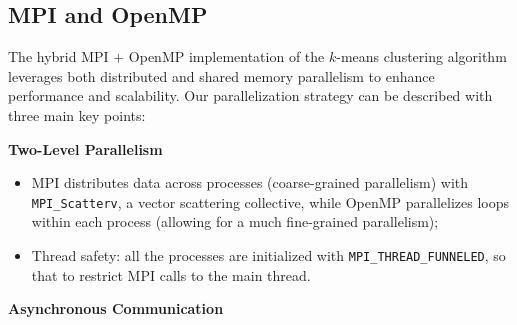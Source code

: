 \documentclass[11pt, journal]{IEEEtran}
\newcommand{\nwl}{

\vspace{11pt}

}
\begin{document}
\subsection{MPI and OpenMP}

The hybrid MPI $+$ OpenMP implementation of the $k$-means clustering algorithm leverages both distributed and shared memory parallelism to enhance performance and scalability. Our parallelization strategy can be described with three main key points:
\nwl
\noindent \textbf{Two-Level Parallelism}
\begin{itemize}
    \item MPI distributes data across processes (coarse-grained parallelism) with \texttt{MPI\_Scatterv}, a vector scattering collective, while OpenMP parallelizes loops within each process (allowing for a much fine-grained parallelism);
    \item Thread safety: all the processes are initialized with \texttt{MPI\_THREAD\_FUNNELED}, so that to restrict MPI calls to the main thread.
\end{itemize}
\nwl
\noindent \textbf{Asynchronous Communication}
\end{document}

